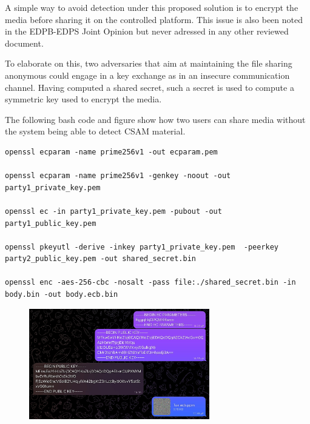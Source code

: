 A simple way to avoid detection under this proposed solution is to encrypt the media before sharing it on the controlled platform. This issue is also been noted in the EDPB-EDPS Joint Opinion \cite{Joint} but never adressed in any other reviewed document.

To elaborate on this, two adversaries that aim at maintaining the file sharing anonymous could engage in a key exchange as in an insecure communication channel. Having computed a shared secret, such a secret is used to compute a symmetric key used to encrypt the media.

The following bash code and figure show how two users can share media without the system being able to detect CSAM material.
\\


\begin{lstlisting}
openssl ecparam -name prime256v1 -out ecparam.pem

openssl ecparam -name prime256v1 -genkey -noout -out party1_private_key.pem

openssl ec -in party1_private_key.pem -pubout -out party1_public_key.pem

openssl pkeyutl -derive -inkey party1_private_key.pem  -peerkey party2_public_key.pem -out shared_secret.bin

openssl enc -aes-256-cbc -nosalt -pass file:./shared_secret.bin -in body.bin -out body.ecb.bin
\end{lstlisting}

\begin{figure}
    \centering
    \includegraphics[keepaspectratio,width=0.7\textwidth]{05-results/img/enc_chat.jpg}
\end{figure}

